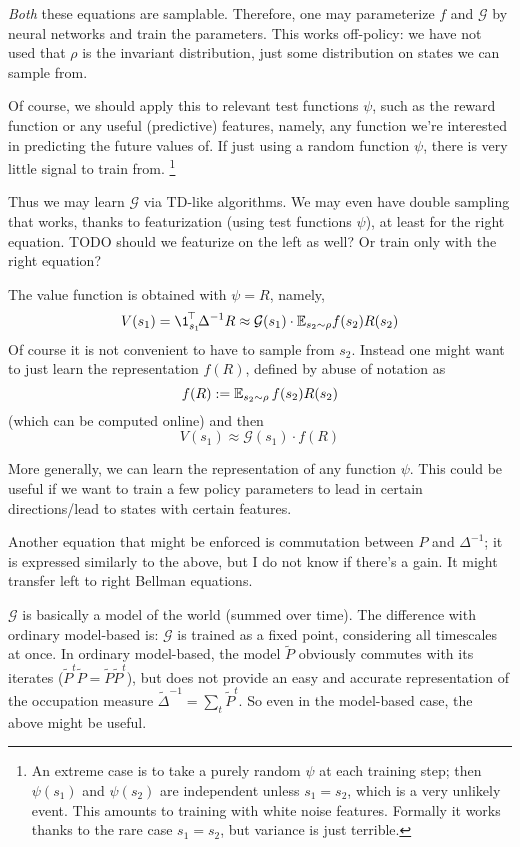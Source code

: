 \documentclass[11pt,a4paper]{article}
\newcommand{\green}{\mathcal{G}}
\begin{document}
\emph{Both} these equations are samplable. Therefore, one may
parameterize $f$ and $\green$ by neural networks and train the
parameters. This works off-policy: we have not used that $\rho$ is the
invariant distribution, just some distribution on states we can sample
from.

Of course, we should apply this to relevant test functions $\psi$,
such as the reward function or any useful (predictive) features, namely,
any function we're interested in predicting the future values of. 
If just using a
random function $\psi$, there is very little signal to train
from. \footnote{An extreme case is to take a purely random $\psi$ at each
training step; then $\psi(s_1)$ and $\psi(s_2)$ are independent unless $s_1=s_2$,
which is a very unlikely event. This amounts to training with white noise
features. Formally it works thanks to the rare case $s_1=s_2$, but
variance is just terrible.}

Thus we may learn $\green$ via TD-like algorithms. We may even have
double sampling that works, thanks to featurization (using test functions
$\psi$), at least for the right equation. TODO should we featurize on the
left as well? Or train only with the right equation?

The value function is obtained with $\psi=R$, namely,
\begin{equation}
V(s_1)=\transp{\1_{s_1}}\Delta^{-1}R\approx
\green(s_1)\cdot\E_{s_2\sim \rho}
f(s_2)R(s_2)
\end{equation}
Of course it is not convenient to have to sample from $s_2$. Instead one
might want to just learn the representation $f(R)$, defined by abuse of
notation as
\begin{equation}
f(R)\mathrel{\mathop{:}}= \mathbb{E}_{s_2\sim \rho} \,f(s_2)R(s_2)
\end{equation}
(which can be computed online)
and then
\begin{equation}
V(s_1)\approx \green(s_1)\cdot f(R)
\end{equation}

More generally, we can learn the representation of any function $\psi$.
This could be useful if we want to train a few policy parameters to lead in
certain directions/lead to states with certain features.

Another equation that might be enforced is commutation between
$P$ and $\Delta^{-1}$; it is expressed similarly to the above, but I do
not know if there's a gain. It might transfer left to right Bellman
equations.

$\green$ is basically a model of the world (summed over time). The
difference with ordinary model-based is: $\green$ is trained as a fixed
point, considering all timescales at once. In ordinary model-based, the
model $\tilde P$ obviously commutes with its iterates ($\tilde P^t\tilde
P=\tilde P\tilde P^t$), but does not provide an easy and accurate
representation of the occupation measure $\tilde \Delta^{-1}=\sum_t \tilde P^t$. So even in
the model-based case, the above might be useful.
\end{document}
